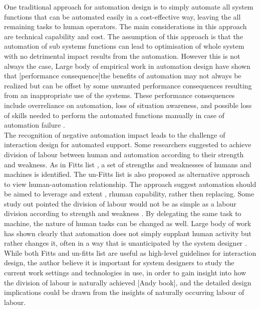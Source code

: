 One traditional approach for automation design is to simply automate all system functions that can be automated easily in a cost-effective way, leaving the all remaining tasks to human operators. The main considerations in this approach are technical capability and cost. The assumption of this approach is that the automation of sub systems functions can lead to optimisation of whole system with no detrimental impact results from the automation. However this is not always the case, Large body of empirical work in automation design have shown that [performance consequence]the benefits of automation may not always be realized but can be offset by some unwanted performance consequences resulting from an inappropriate use of the systems. These performance consequences include overreliance on automation, loss of situation awareness, and possible loss of skills needed to perform the automated functions manually in case of automation failure \cite{Kaber1997}.\\ 

The recognition of negative automation impact leads to the challenge of interaction design for automated support.  Some researchers suggested to achieve division of labour between human and automation according to their strength and weakness. As in Fitts list \cite{Fitts} , a set of strengths and weaknesses of humans and machines is identified. The un-Fitts list \cite{Hoffman2002} is also proposed as alternative approach to view human-automation relationship. The approach suggest automation should be aimed to leverage and extent , rhuman capability, rather then replacing. Some study out pointed the division of labour would not be as simple as a labour division according to strength and weakness \cite{Bradshaw2011}. By delegating the same task to machine, the nature of human tasks can be changed as well. Large body of work has shown clearly that automation does not simply supplant human activity but rather changes it, often in a way that is unanticipated by the system designer \cite{Bradshaw2011}. While both Fitts and un-fitts list are useful as high-level guidelines for interaction design, the author believe it is important for system designers to study the current work settings and technologies in use, in order to gain insight into how the division of labour is naturally achieved [Andy book], and the detailed design implications could be drawn from the insights of naturally occurring labour of labour. \\


